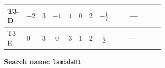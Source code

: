 \documentclass[8pt]{article}
\begin{document}
\begin{landscape}
\begin{longtable}{@{}llcccccc >{\raggedright\arraybackslash}p{0.21\linewidth} >{\raggedright\arraybackslash}p{0.21\linewidth} >{\raggedright\arraybackslash}p{0.21\linewidth}@{}}
\midrule
T3-D & $-2$ & $3$ & $-1$ & $1$ & $0$ & $2$ & $-\frac{1}{2}$ & \scriptsize\adjustbox{max width=\linewidth}{$\begin{gathered} +8 {\lambda_{H1}} {\lambda_{S_1}}\end{gathered}$} & --- & \scriptsize\adjustbox{max width=\linewidth}{$\begin{gathered} -\frac{33 {g_2}^2 {\lambda_{H1}}}{2}\end{gathered}$} \\
\midrule
T3-E & $0$ & $3$ & $0$ & $3$ & $1$ & $2$ & $\frac{1}{2}$ & \scriptsize\adjustbox{max width=\linewidth}{$\begin{gathered} +8 {\lambda_{H1}} {\lambda_{S_1}}\end{gathered}$} & --- & \scriptsize\adjustbox{max width=\linewidth}{$\begin{gathered} -\frac{33 {g_2}^2 {\lambda_{H1}}}{2}\end{gathered}$} \\
\midrule
\bottomrule
\end{longtable}
\clearpage
\noindent\textbf{Search name: }\texttt{lambdaH1}\par\smallskip

\end{landscape}
\end{document}
